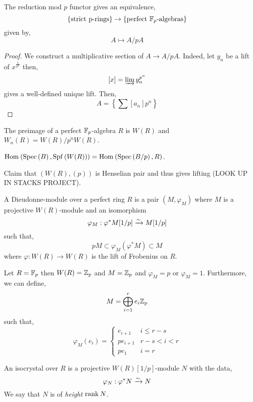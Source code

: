 \documentclass[12pt]{article}
\begin{document}
\begin{theorem}
The reduction mod $p$ functor gives an equivalence,
\[ \{ \text{strict p-rings} \} \to \{ \text{perfect } \mathbb{F}_p\text{-algebras} \} \]
given by,
\[ A \mapsto A / p A \]
\end{theorem}

\begin{proof}
We construct a multiplicative section of $A \to A / p A$. Indeed, let $y_n$ be a lift of $x^{\frac{1}{p^n}}$ then,
\[ [x] = \varinjlim y_n^{p^n} \]
gives a well-defined unique lift. Then,
\[ A = \left\{ \sum [a_n] p^n \right\} \]
\end{proof}

\begin{rmk}
The preimage of a perfect $\mathbb{F}_p$-algebra $R$ is $W(R)$ and $W_n(R) = W(R) / p^n W(R)$. 
\end{rmk}

\newcommand{\Spf}[1]{\mathrm{Spf}\left( #1 \right)}

\begin{rmk}
$\Hom{}{\Spec{B}}{\Spf{W(R)}} = \Hom{}{\Spec{B/p}}{R}$.
\end{rmk}

\begin{rmk}
Claim that $(W(R), (p))$ is Henselian pair and thus gives \etale lifting (LOOK UP IN STACKS PROJECT).
\end{rmk}

\begin{defn}
A Dieudonne-module over a perfect ring $R$ is a pair $(M, \varphi_M)$ where $M$ is a projective $W(R)$-module and an isomorphism
\[ \varphi_M : \varphi^* M[1/p] \xrightarrow{\sim} M[1/p] \]
such that,
\[ p M \subset \varphi_M (\varphi^* M) \subset M \]
where $\varphi : W(R) \to W(R)$ is the lift of Frobenius on $R$. 
\end{defn}

\begin{example}
Let $R = \mathbb{F}_p$ then $W(R) = \mathbb{Z}_p$ and $M = \mathbb{Z}_p$ and $\varphi_M = p$ or $\varphi_M = 1$. Furthermore, we can define,
\[ M = \bigoplus_{i = 1}^r e_i \mathbb{Z}_p \]
such that,
\[ \varphi_M(e_i) = 
\begin{cases}
e_{i + 1} & i \le r - s
\\
p e_{i+1} & r - s < i < r
\\
p e_1 & i = r 
\end{cases} \]
\end{example}

\begin{defn}
An isocrystal over $R$ is a projective $W(R)[1/p]$-module $N$ with the data,
\[ \varphi_N : \varphi^*N \xrightarrow{\sim} N \]
We say that $N$ is of \textit{height} $\operatorname{\mathrm{rank}}{N}$.
\end{defn}
\end{document}

